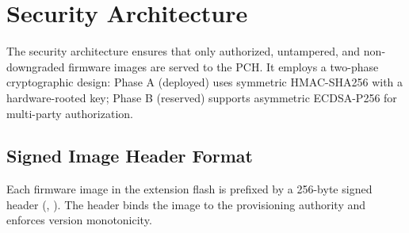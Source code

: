 \section{Security Architecture}
\label{sec:security}

The \vbfc security architecture ensures that only authorized, untampered, and non-downgraded firmware images are served to the \ac{PCH}. It employs a two-phase cryptographic design: Phase A (deployed) uses symmetric \ac{HMAC}-\ac{SHA}256 with a hardware-rooted key; Phase B (reserved) supports asymmetric ECDSA-P256 for multi-party authorization.

\subsection{Signed Image Header Format}
Each firmware image in the extension flash is prefixed by a 256-byte signed header (, ). The header binds the image to the provisioning authority and enforces version monotonicity.

